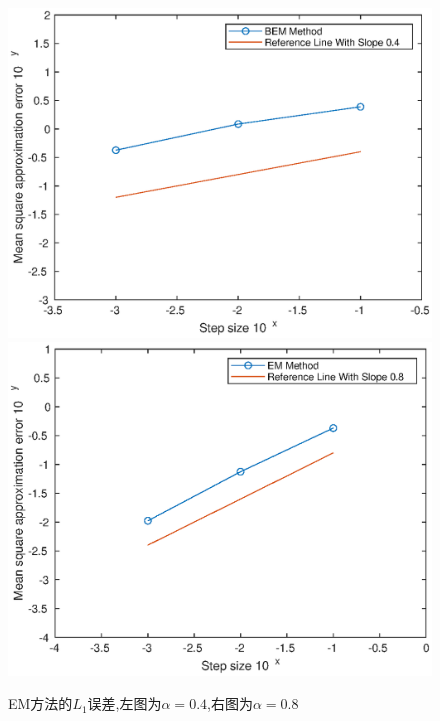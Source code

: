 \documentclass[12pt,final]{article}
\numberwithin{equation}{section}
\numberwithin{figure}{section}
\numberwithin{table}{section}
\theoremstyle{plain}
\theoremstyle{Definition}
\theoremstyle{Remark}
\begin{document}
		
		\begin{figure}[htp!]
			\centering
			\includegraphics[width=0.45\linewidth]{alpha=0.4.eps}
			\hfill
			\includegraphics[width=0.45\linewidth]{alpha=0.8.eps}
			\caption{EM方法的$L_1$误差,左图为$\alpha=0.4$,右图为$\alpha=0.8$}
			\label{fig:image}
			\vspace{-2ex}
			{}\end{figure}



	
	
\end{document}
